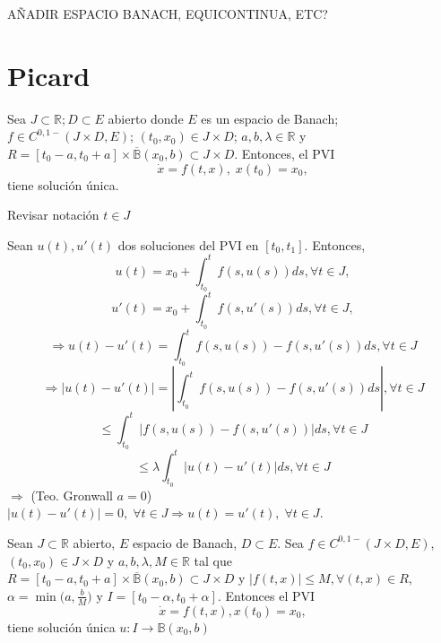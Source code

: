 AÑADIR ESPACIO BANACH, 
EQUICONTINUA, ETC?

\section{Picard}

\begin{theo}[de Unicidad]
  Sea $J \subset \mathbb{R}; D \subset E$ abierto donde $E$ es un espacio de Banach; $f \in C^{0,1-}(J \times D, E)$; $(t_{0}, x_{0}) \in J \times D$; $ a, b, \lambda \in \mathbb{R}$ y $R = [t_{0} - a, t_{0} + a] \times \overline{\mathbb{B}}(x_{0}, b) \subset J \times D$. Entonces, el PVI
  \[ 
    \dot{x} = f(t, x), \; x(t_{0}) = x_{0},
  \] 
  tiene solución única.
\end{theo}

Revisar notación $t \in J$

\begin{dem}
  Sean $u(t), u'(t)$ dos soluciones del PVI en $[t_{0}, t_{1}]$. Entonces,
  \[ 
    u(t) = x_{0} + \int_{t_{0}}^{t} f(s, u(s)) ds, \forall t \in J,
  \] 
  \[ 
    u'(t) = x_{0} + \int_{t_{0}}^{t} f(s, u'(s)) ds, \forall t \in J,
  \] 
  \[ 
    \Rightarrow u(t) - u'(t) = \int_{t_{0}}^{t} f(s, u(s)) - f(s, u'(s)) ds, \forall t \in J
  \] 
  \[ 
    \Rightarrow | u(t) - u'(t) | = | \int_{t_{0}}^{t} f(s, u(s)) - f(s, u'(s)) ds |, \forall t \in J
 
  \] 
  \[ 
    \leq \int_{t_{0}}^{t} | f(s, u(s)) - f(s, u'(s)) | ds, \forall t \in J
  \] 
  \[ 
    \leq  \lambda \int_{t_{0}}^{t} | u(t) - u'(t) | ds, \forall t \in J
  \] 
  $\Rightarrow $ (Teo. Gronwall $a = 0$) $ | u(t) - u'(t) | = 0, \; \forall t \in J \Rightarrow u(t) = u'(t), \; \forall t \in J$.
\end{dem}

\begin{theo}[Picard]
  Sean $J \subset \mathbb{R}$ abierto, $E$ espacio de Banach, $D \subset E$. Sea $f \in C^{0,1-}( J \times D, E)$, $(t_{0}, x_{0}) \in J \times D$ y $a, b, \lambda, M \in \mathbb{R}$ tal que $R = [t_{0} - a, t_{0} + a] \times \overline{\mathbb{B}}(x_{0}, b) \subset J \times D$ y $| f(t,x) |\leq M, \forall (t,x) \in R$, $\alpha = \min\big ( a, \frac{b}{M} \big )$ y $I = [t_{0} - \alpha, t_{0} +\alpha]$. Entonces el PVI
  \[ 
    \dot{x} = f(t, x), x(t_{0}) = x_{0}, 
  \] 
  tiene solución única $u: I \to \mathbb{B}(x_{0}, b)$
\end{theo}


